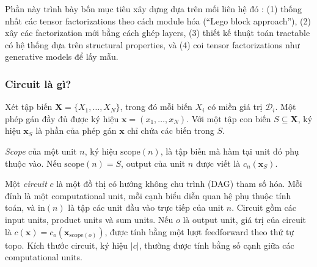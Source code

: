 Phần này trình bày bốn mục tiêu xây dựng dựa trên mối liên hệ đó
\cite{chrysos2025foundationsTutorial}: (1) thống nhất các tensor factorizations theo
cách module hóa (``Lego block approach''), (2) xây các factorization mới bằng cách
ghép layers, (3) thiết kế thuật toán tractable có hệ thống dựa trên structural
properties, và (4) coi tensor factorizations như generative models để lấy mẫu.

\subsubsection{Circuit là gì?}

Xét tập biến $\mathbf{X}=\{X_1,\ldots,X_N\}$, trong đó mỗi biến
$X_i$ có miền giá trị $\mathcal{D}_i$.  Một phép gán đầy đủ được ký hiệu
$\mathbf{x}=(x_1,\ldots,x_N)$.  Với một tập con biến $S\subseteq\mathbf{X}$, ký
hiệu $\mathbf{x}_S$ là phần của phép gán $\mathbf{x}$ chỉ chứa các biến trong $S$.

\begin{definition}
\label{def:circuit-scope}
\emph{Scope} của một unit $n$, ký hiệu $\mathrm{scope}(n)$, là tập biến mà hàm tại
unit đó phụ thuộc vào.  Nếu $\mathrm{scope}(n)=S$, output của unit $n$ được viết là
$c_n(\mathbf{x}_S)$.
\end{definition}

\begin{definition}
\label{def:circuit}
Một \emph{circuit} $c$ là một đồ thị có hướng không chu trình (DAG) tham số hóa.
Mỗi đỉnh là một computational unit, mỗi cạnh biểu diễn quan hệ phụ thuộc tính toán,
và $\mathrm{in}(n)$ là tập các unit đầu vào trực tiếp của unit $n$.  Circuit gồm
các input units, product units và sum units.  Nếu $o$ là output unit, giá trị của
circuit là
$c(\mathbf{x})=c_o(\mathbf{x}_{\mathrm{scope}(o)})$, được tính bằng một lượt
feedforward theo thứ tự topo.  Kích thước circuit, ký hiệu $|c|$, thường được tính
bằng số cạnh giữa các computational units.
\end{definition}

